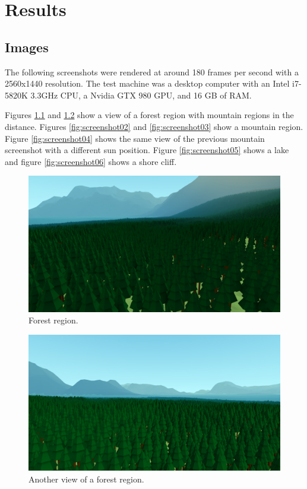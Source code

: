 
\chapter{Results} \label{results}

\section{Images}

The following screenshots were rendered at around 180 frames per second with a 2560x1440 resolution.
The test machine was a desktop computer with an Intel i7-5820K 3.3GHz CPU, a Nvidia GTX 980 GPU, and 16 GB of RAM.

Figures \ref{fig:screenshot00} and \ref{fig:screenshot01} show a view of a forest region with mountain regions in the distance.
Figures \ref{fig:screenshot02} and \ref{fig:screenshot03} show a mountain region.
Figure \ref{fig:screenshot04} shows the same view of the previous mountain screenshot with a different sun position.
Figure \ref{fig:screenshot05} shows a lake and figure \ref{fig:screenshot06} shows a shore cliff.

\begin{figure}
	\centering
		\includegraphics[width=1.0\textwidth]{figures/Screenshot000000.jpg}
	\caption{Forest region.}
	\label{fig:screenshot00}
\end{figure}

\begin{figure}
	\centering
		\includegraphics[width=1.0\textwidth]{figures/Screenshot000001.jpg}
	\caption{Another view of a forest region.}
	\label{fig:screenshot01}
\end{figure}

